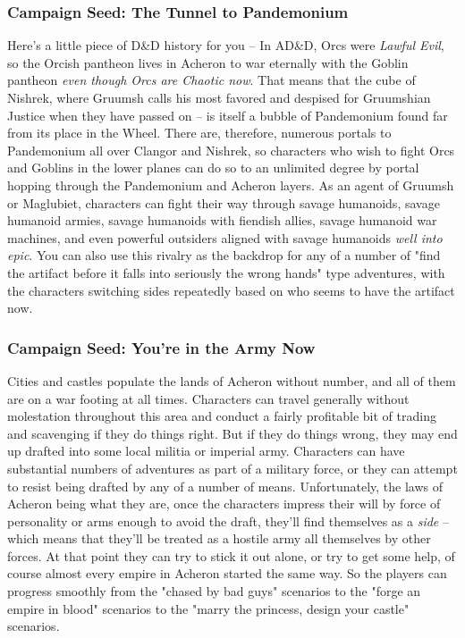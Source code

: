 \subsubsection{Campaign Seed: The Tunnel to Pandemonium}

Here's a little piece of D\&D history for you -- In AD\&D, Orcs were \textit{Lawful Evil}, so the Orcish pantheon lives in Acheron to war eternally with the Goblin pantheon \textit{even though Orcs are Chaotic now}. That means that the cube of Nishrek, where Gruumsh calls his most favored and despised for Gruumshian Justice when they have passed on -- is itself a bubble of Pandemonium found far from its place in the Wheel. There are, therefore, numerous portals to Pandemonium all over Clangor and Nishrek, so characters who wish to fight Orcs and Goblins in the lower planes can do so to an unlimited degree by portal hopping through the Pandemonium and Acheron layers. As an agent of Gruumsh or Maglubiet, characters can fight their way through savage humanoids, savage humanoid armies, savage humanoids with fiendish allies, savage humanoid war machines, and even powerful outsiders aligned with savage humanoids \textit{well into epic}. You can also use this rivalry as the backdrop for any of a number of "find the artifact before it falls into seriously the wrong hands" type adventures, with the characters switching sides repeatedly based on who seems to have the artifact now.

\subsubsection{Campaign Seed: You're in the Army Now}

Cities and castles populate the lands of Acheron without number, and all of them are on a war footing at all times. Characters can travel generally without molestation throughout this area and conduct a fairly profitable bit of trading and scavenging if they do things right. But if they do things wrong, they may end up drafted into some local militia or imperial army. Characters can have substantial numbers of adventures as part of a military force, or they can attempt to resist being drafted by any of a number of means. Unfortunately, the laws of Acheron being what they are, once the characters impress their will by force of personality or arms enough to avoid the draft, they'll find themselves as a \textit{side} -- which means that they'll be treated as a hostile army all themselves by other forces. At that point they can try to stick it out alone, or try to get some help, of course almost every empire in Acheron started the same way. So the players can progress smoothly from the "chased by bad guys" scenarios to the "forge an empire in blood" scenarios to the "marry the princess, design your castle" scenarios.

